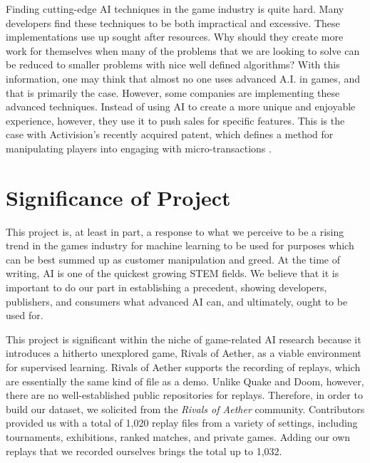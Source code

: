 Finding cutting-edge AI techniques in the game industry is quite hard. Many developers find these techniques to be both impractical and excessive. These implementations use up sought after resources. Why should they create more work for themselves when many of the problems that we are looking to solve can be reduced to smaller problems with nice well defined algorithms? With this information, one may think that almost no one uses advanced A.I. in games, and that is primarily the case. However, some companies are implementing these advanced techniques. Instead of using AI to create a more unique and enjoyable experience, however, they use it to push sales for specific features. This is the case with Activision's recently acquired patent, which defines a method for manipulating players into engaging with micro-transactions \cite{Marr:2017}.



\section{Significance of Project}

This project is, at least in part, a response to what we perceive to be a rising trend in the games industry for machine learning to be used for purposes which can be best summed up as customer manipulation and greed. At the time of writing, AI is one of the quickest growing STEM fields. We believe that it is important to do our part in establishing a precedent, showing developers, publishers, and consumers what advanced AI can, and ultimately, ought to be used for.

This project is significant within the niche of game-related AI research because it introduces a hitherto unexplored game, Rivals of Aether, as a viable environment for supervised learning. Rivals of Aether supports the recording of replays, which are essentially the same kind of file as a demo. Unlike Quake and Doom, however, there are no well-established public repositories for replays. Therefore, in order to build our dataset, we solicited from the {\it Rivals of Aether} community. Contributors provided us with a total of 1,020 replay files from a variety of settings, including tournaments, exhibitions, ranked matches, and private games. Adding our own replays that we recorded ourselves brings the total up to 1,032.

